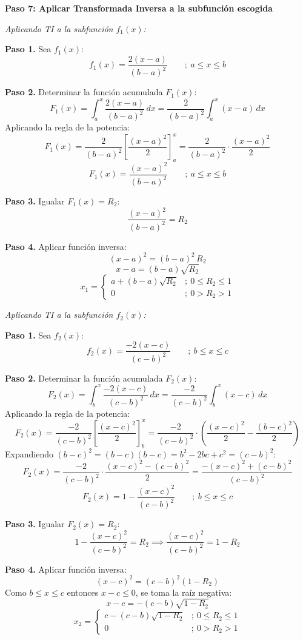 \textbf{Paso 7: Aplicar Transformada Inversa a la subfunción escogida}

\textit{Aplicando TI a la subfunción $f_1(x)$:}

\textbf{Paso 1.} Sea $f_1(x)$:
\[
f_1(x) = \frac{2(x-a)}{(b-a)^2} \qquad ;\ a \leq x \leq b
\]

\textbf{Paso 2.} Determinar la función acumulada $F_1(x)$:
\[
F_1(x) = \int_a^x \frac{2(x-a)}{(b-a)^2}\,dx = \frac{2}{(b-a)^2} \int_a^x (x-a)\,dx
\]
Aplicando la regla de la potencia:
\[
F_1(x) = \frac{2}{(b-a)^2} \left[\frac{(x-a)^2}{2}\right]_a^x = \frac{2}{(b-a)^2}\cdot\frac{(x-a)^2}{2}
\]
\[
\boxed{F_1(x) = \frac{(x-a)^2}{(b-a)^2}} \qquad ;\ a \leq x \leq b
\]

\textbf{Paso 3.} Igualar $F_1(x) = R_2$:
\[
\frac{(x-a)^2}{(b-a)^2} = R_2
\]

\textbf{Paso 4.} Aplicar función inversa:
\[
(x-a)^2 = (b-a)^2\,R_2
\]
\[
x - a = (b-a)\sqrt{R_2}
\]
\[
x_1=\begin{cases}a+(b-a)\sqrt{R_2} &;\ 0 \leq R_2 \leq 1 \\ 0 &;\ 0 > R_2 > 1\end{cases}
\]

\textit{Aplicando TI a la subfunción $f_2(x)$:}

\textbf{Paso 1.} Sea $f_2(x)$:
\[
f_2(x) = \frac{-2(x-c)}{(c-b)^2} \qquad ;\ b \leq x \leq c
\]

\textbf{Paso 2.} Determinar la función acumulada $F_2(x)$:
\[
F_2(x) = \int_b^x \frac{-2(x-c)}{(c-b)^2}\,dx = \frac{-2}{(c-b)^2} \int_b^x (x-c)\,dx
\]
Aplicando la regla de la potencia:
\[
F_2(x) = \frac{-2}{(c-b)^2}\left[\frac{(x-c)^2}{2}\right]_b^x = \frac{-2}{(c-b)^2}\cdot\left(\frac{(x-c)^2}{2} - \frac{(b-c)^2}{2}\right)
\]
Expandiendo $(b-c)^2 = (b-c)(b-c) = b^2-2bc+c^2 = (c-b)^2$:
\[
F_2(x) = \frac{-2}{(c-b)^2}\cdot\frac{(x-c)^2-(c-b)^2}{2} = \frac{-(x-c)^2+(c-b)^2}{(c-b)^2}
\]
\[
\boxed{F_2(x) = 1 - \frac{(x-c)^2}{(c-b)^2}} \qquad ;\ b \leq x \leq c
\]

\textbf{Paso 3.} Igualar $F_2(x) = R_2$:
\[
1 - \frac{(x-c)^2}{(c-b)^2} = R_2 \implies \frac{(x-c)^2}{(c-b)^2} = 1-R_2
\]

\textbf{Paso 4.} Aplicar función inversa:
\[
(x-c)^2 = (c-b)^2(1-R_2)
\]
Como $b \leq x \leq c$ entonces $x-c \leq 0$, se toma la raíz negativa:
\[
x-c = -(c-b)\sqrt{1-R_2}
\]
\[
x_2=\begin{cases}c-(c-b)\sqrt{1-R_2} &;\ 0 \leq R_2 \leq 1 \\ 0 &;\ 0 > R_2 > 1\end{cases}
\]

